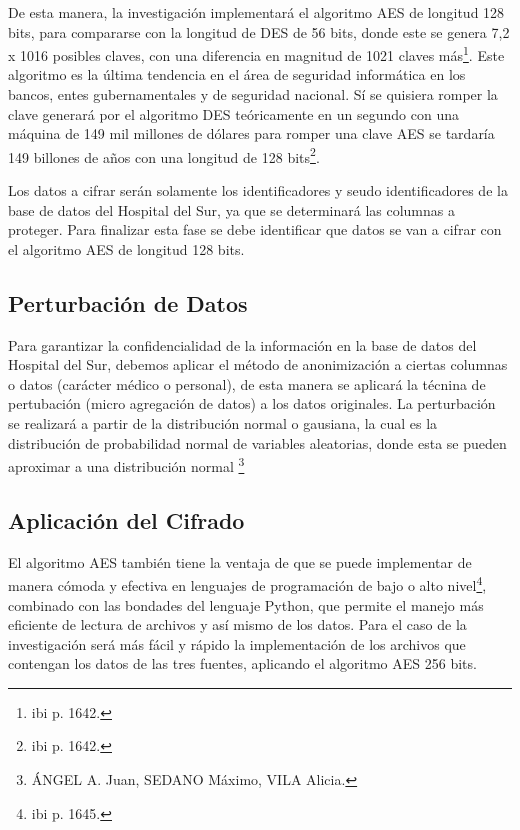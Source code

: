 \documentclass[a4paper,openright,12pt]{book}
\theoremstyle{definition}
\theoremstyle{remark}
\begin{document}
De esta manera, la investigación implementará el algoritmo AES de longitud 128 bits, para compararse con la longitud de DES de 56 bits, donde este se genera 7,2 x 1016 posibles claves, con una diferencia en magnitud de 1021 claves más\footnote{ibi p. 1642.}. Este algoritmo es la última tendencia en el área de seguridad informática en los bancos, entes gubernamentales y de seguridad nacional. Sí se quisiera romper la clave generará por el algoritmo DES teóricamente en un segundo con una máquina de 149 mil millones de dólares para romper una clave AES se tardaría 149 billones de años con una longitud de 128 bits\footnote{ibi p. 1642.}.

Los datos a cifrar serán solamente los identificadores y seudo identificadores de la base de datos del Hospital del Sur, ya que  se determinará las columnas a proteger. Para finalizar esta fase se debe identificar que datos se van a cifrar con el algoritmo AES de longitud 128 bits.

    \subsection{Perturbación de Datos}
     Para garantizar la confidencialidad de la información en la base de datos del Hospital del Sur, debemos aplicar el método de anonimización a ciertas columnas o datos (carácter médico o personal), de esta manera se aplicará la técnina de pertubación (micro agregación de datos) a los datos originales. La perturbación se realizará a partir de la distribución normal o gausiana, la cual es la distribución de probabilidad normal de variables aleatorias, donde esta se pueden aproximar a una distribución normal \footnote{ÁNGEL A. Juan, SEDANO Máximo, VILA Alicia.} %
     
     
     \subsection{Aplicación del Cifrado}
     El algoritmo AES también tiene la ventaja de que se puede implementar de manera cómoda y efectiva en lenguajes de programación de bajo o alto nivel\footnote{ibi p. 1645.}, combinado con las bondades del lenguaje Python, que permite el manejo más eficiente de lectura de archivos y así mismo de los datos. Para el caso de la investigación será más fácil y rápido la implementación de los archivos que contengan los datos de las tres fuentes, aplicando el algoritmo AES 256 bits.
     
\end{document}

